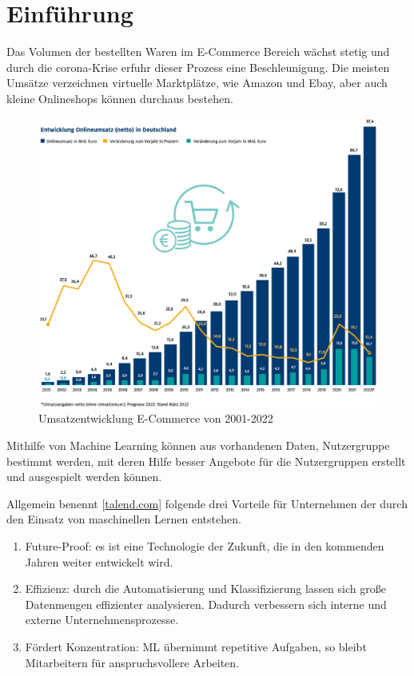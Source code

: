 \chapter{Einführung}
Das Volumen der bestellten Waren im E-Commerce Bereich wächst stetig und durch die \Gls{corona}-Krise erfuhr dieser Prozess eine Beschleunigung. Die meisten Umsätze verzeichnen virtuelle Marktplätze, wie Amazon und Ebay, aber auch kleine Onlineshops können durchaus bestehen.

\begin{figure}[!ht]
	\centering
	\includegraphics[width=\linewidth]{images/chapter1/umsatzprognose_2022.eps}
	\caption{Umsatzentwicklung E-Commerce von 2001-2022}
	\label{img:stat_prognose_2022}
\end{figure}

Mithilfe von Machine Learning können aus vorhandenen Daten, Nutzergruppe bestimmt werden, mit deren Hilfe besser Angebote für die Nutzergruppen erstellt und ausgespielt werden können.\vspace{0.2cm}

Allgemein benennt [\href{https://www.talend.com/de/resources/maschinelles-lernen}{talend.com}] folgende drei Vorteile für Unternehmen der durch den Einsatz von maschinellen Lernen entstehen.

\begin{enumerate}
	\item Future-Proof: es ist eine Technologie der Zukunft, die in den kommenden Jahren weiter entwickelt wird.
	\item Effizienz: durch die Automatisierung und Klassifizierung lassen sich große Datenmengen effizienter analysieren. Dadurch verbessern sich interne und externe Unternehmensprozesse.
	\item Fördert Konzentration: ML übernimmt repetitive Aufgaben, so bleibt Mitarbeitern für anspruchsvollere Arbeiten.
\end{enumerate}

